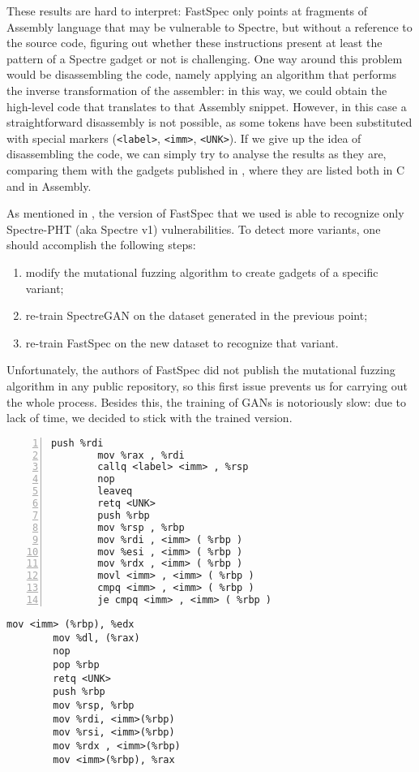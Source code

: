 \documentclass[target=mst,aauheader=aics]{thud}
\theoremstyle{definition}
\begin{document}
These results are hard to interpret: FastSpec only points at fragments of Assembly language that may be vulnerable to Spectre, but without a reference to the source code, figuring out whether these instructions present at least the pattern of a Spectre gadget or not is challenging. One way around this problem would be disassembling the code, namely applying an algorithm that performs the inverse transformation of the assembler: in this way, we could obtain the high-level code that translates to that Assembly snippet. However, in this case a straightforward disassembly is not possible, as some tokens have been substituted with special markers (\texttt{<label>}, \texttt{<imm>}, \texttt{<UNK>}). If we give up the idea of disassembling the code, we can simply try to analyse the results as they are, comparing them with the gadgets published in \cite{Kocher2018}, where they are listed both in C and in Assembly.

As mentioned in \cite{Tol2021}, the version of FastSpec that we used is able to recognize only Spectre-PHT (aka Spectre v1) vulnerabilities. To detect more variants, one should accomplish the following steps:
\begin{enumerate}
	\item modify the mutational fuzzing algorithm to create gadgets of a specific variant;
	\item re-train SpectreGAN on the dataset generated in the previous point;
	\item re-train FastSpec on the new dataset to recognize that variant.
\end{enumerate}
Unfortunately, the authors of FastSpec did not publish the mutational fuzzing algorithm in any public repository, so this first issue prevents us for carrying out the whole process. Besides this, the training of GANs is notoriously slow: due to lack of time, we decided to stick with the trained version. 

\begin{minipage}{.45\textwidth}
	\begin{lstlisting}[basicstyle=\footnotesize\ttfamily, caption={Window 369-379}, label=gadget1, numbers=left]
		push %rdi
		mov %rax , %rdi
		callq <label> <imm> , %rsp
		nop
		leaveq
		retq <UNK>
		push %rbp
		mov %rsp , %rbp
		mov %rdi , <imm> ( %rbp )
		mov %esi , <imm> ( %rbp )
		mov %rdx , <imm> ( %rbp )
		movl <imm> , <imm> ( %rbp )
		cmpq <imm> , <imm> ( %rbp )
		je cmpq <imm> , <imm> ( %rbp )
	\end{lstlisting}
\end{minipage}\hfill
\begin{minipage}{.45\textwidth}
	\begin{lstlisting}[caption={Window 7992-7997}, label=gadget2, numbers=right]
		mov <imm> (%rbp), %edx
		mov %dl, (%rax)
		nop
		pop %rbp
		retq <UNK>
		push %rbp
		mov %rsp, %rbp
		mov %rdi, <imm>(%rbp)
		mov %rsi, <imm>(%rbp)
		mov %rdx , <imm>(%rbp)
		mov <imm>(%rbp), %rax
	\end{lstlisting}
\end{minipage}
\end{document}
